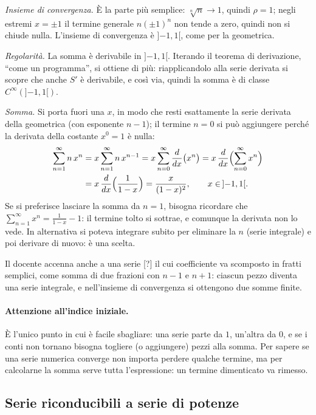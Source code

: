 \emph{Insieme di convergenza.} È la parte più semplice: $\sqrt[n]{n}\to 1$, quindi $\rho=1$; negli estremi
$x=\pm1$ il termine generale $n(\pm1)^n$ non tende a zero, quindi non si chiude nulla. L'insieme di convergenza
è $]{-1},1[$, come per la geometrica.

\emph{Regolarità.} La somma è derivabile in $]{-1},1[$.
Iterando il teorema di derivazione, ``come un programma'', si ottiene di più: riapplicandolo alla serie derivata
si scopre che anche $S'$ è derivabile, e così via, quindi la somma è di classe $C^\infty(]{-1},1[)$.

\emph{Somma.}
Si porta fuori una $x$, in modo che resti esattamente la serie derivata della geometrica (con esponente $n-1$);
il termine $n=0$ si può aggiungere perché la derivata della costante $x^0=1$ è nulla:
\begin{align*}
  \sum_{n=1}^{\infty} n\, x^n
  &= x \sum_{n=1}^{\infty} n\, x^{n-1}
  = x \sum_{n=0}^{\infty} \frac{d}{dx}\bigl(x^n\bigr)
  = x\, \frac{d}{dx} \Bigl( \sum_{n=0}^{\infty} x^n \Bigr) \\
  &= x\, \frac{d}{dx} \Bigl( \frac{1}{1-x} \Bigr)
  = \frac{x}{(1-x)^2} ,
  \qquad x\in\,]{-1},1[ .
\end{align*}
Se si preferisce lasciare la somma da $n=1$, bisogna ricordare che $\sum_{n=1}^{\infty} x^n = \frac{1}{1-x}-1$:
il termine tolto si sottrae, e comunque la derivata non lo vede. In alternativa si poteva integrare subito per
eliminare la $n$ (serie integrale) e poi derivare di nuovo: è una scelta.

Il docente accenna anche a una serie [?] il cui coefficiente va scomposto in fratti semplici, come somma di due
frazioni con $n-1$ e $n+1$: ciascun pezzo diventa una serie integrale, e nell'insieme di convergenza si ottengono
due somme finite.

\paragraph{Attenzione all'indice iniziale.}
È l'unico punto in cui è facile sbagliare: una serie parte da $1$, un'altra da $0$, e se i conti non tornano
bisogna togliere (o aggiungere) pezzi alla somma.
Per sapere se una serie numerica converge non importa perdere qualche termine, ma per calcolarne la somma serve
tutta l'espressione: un termine dimenticato va rimesso.

\subsection{Serie riconducibili a serie di potenze}

